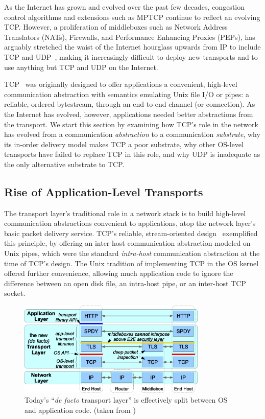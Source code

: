 \def\utcp{$u$TCP\xspace}
\def\utls{$u$TLS\xspace}
\def\ucobs{$u$COBS\xspace}

As the Internet has grown and evolved
over the past few decades,
congestion control algorithms and extensions such as MPTCP
continue to reflect an evolving TCP.
However,
a proliferation of middleboxes
such as 
Network Address Translators (NATs), 
Firewalls,
and 
Performance Enhancing Proxies (PEPs),
has arguably stretched the waist of the Internet hourglass
upwards from IP
to include
TCP and UDP~\cite{rosenberg08udp, ford08breaking, popa10http},
making it increasingly difficult
to deploy new transports
and to
use anything but TCP and UDP 
on the Internet.

TCP~\cite{rfc793} was originally designed to offer applications
a convenient, high-level communication abstraction
with semantics emulating Unix file I/O or pipes:
a reliable, ordered bytestream,
through an end-to-end channel (or connection).
As the Internet has evolved, however,
applications needed better abstractions
from the transport.
We start this section by examining
how TCP's role in the network has evolved
from a communication {\em abstraction} to a communication {\em substrate},
why its in-order delivery model makes TCP a poor substrate,
why other OS-level transports have failed to replace TCP in this role,
and why UDP is inadequate as the only alternative substrate to TCP.

\subsection{Rise of Application-Level Transports}

The transport layer's traditional role in a network stack
is to build high-level communication abstractions
convenient to applications,
atop the network layer's basic packet delivery service.
TCP's reliable, stream-oriented design~\cite{rfc793}
exemplified this principle,
by offering an inter-host communication abstraction
modeled on Unix pipes,
which were the standard {\em intra-host} communication abstraction
at the time of TCP's design.
The Unix tradition of
implementing TCP in the OS kernel
offered further convenience,
allowing much application code to ignore the difference between
an open disk file, an intra-host pipe, or an inter-host TCP socket.

\begin{figure}[tbp]
\centering
\includegraphics[width=0.8\textwidth]{figures/layers.eps}
\caption{Today's ``{\em de facto} transport layer''
	is effectively split between OS and application code. (taken from
    \cite{nowlan12fitting})}
\label{f:layers}
\end{figure}


